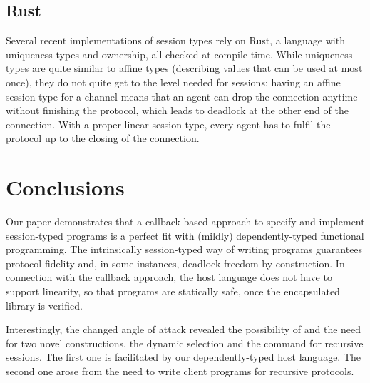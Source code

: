\documentclass[acmsmall,screen]{acmart}
\begin{document}
\subsection{Rust}
\label{sec:rust}



Several recent implementations of session types \cite{DBLP:conf/ecoop/ChenBT22,DBLP:conf/ecoop/LagaillardieNY22,DBLP:conf/ppopp/CutnerYV22,DBLP:conf/coordination/CutnerY21,DBLP:conf/coordination/LagaillardieNY20,DBLP:journals/corr/abs-1909-05970,DBLP:conf/icfp/JespersenML15} rely on Rust, a
language with uniqueness types and ownership, all checked at compile
time. While uniqueness types are quite similar to affine types
(describing values that can be used at most once), they do not quite
get to the level needed for sessions: having an affine session type
for a channel means that an agent can drop the connection anytime
without finishing the protocol, which leads to deadlock at the other
end of the connection. With a proper linear session type, every agent has to
fulfil the protocol up to the closing of the connection.


\section{Conclusions}
\label{sec:conclusions}

Our paper demonstrates that a callback-based approach to
specify and implement session-typed programs is a perfect fit with (mildly)
dependently-typed functional programming. The intrinsically
session-typed way of writing programs guarantees protocol fidelity and,
in some instances, deadlock freedom 
by construction. In connection with the callback approach, the host
language does not have to support linearity, so that programs are
statically safe, once the encapsulated library is verified.

Interestingly, the changed angle of attack revealed the possibility of
and the need for two novel constructions, the dynamic selection and
the {\AUNROLL} command for recursive sessions. The first one is
facilitated by our dependently-typed host language. The second one
arose from the need to write client programs for recursive protocols. 
\end{document}
